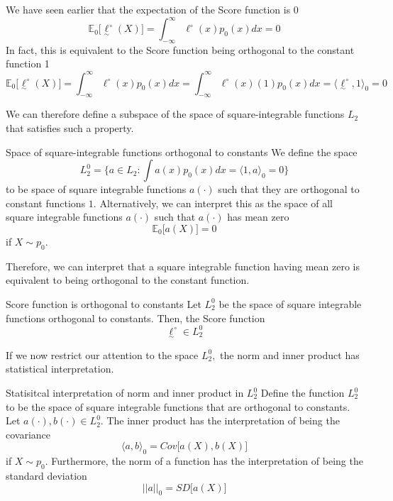 \documentclass[twoside]{article}
\newcommand{\utilde}{\underset{\sim}}
\begin{document}
We have seen earlier that the expectation of the Score function is 0
$$
  \mathbb{E}_{0}\bigg[\utilde{\ell}^{\circ}(X) \bigg] = \int_{-\infty}^{\infty}\ell^{\circ}(x)p_0(x)dx = 0
$$
In fact, this is equivalent to the Score function being orthogonal to the constant function 1
$$
  \mathbb{E}_{0}\bigg[\utilde{\ell}^{\circ}(X) \bigg] = \int_{-\infty}^{\infty}\ell^{\circ}(x)p_0(x)dx = \int_{-\infty}^{\infty}\ell^{\circ}(x)(1)p_0(x)dx = \langle \utilde{\ell}^{\circ}, 1 \rangle_0 = 0
$$

We can therefore define a subspace of the space of square-integrable functions $L_2$ that satisfies such a property.

\begin{definition_exam}{Space of square-integrable functions orthogonal to constants}{} We define the space  
\begin{equation}
  L_{2}^{0} = \{a \in L_2: \int a(x)p_0(x)dx = \langle 1, a \rangle_{0} = 0\} 
\end{equation}
to be space of square integrable functions $a(\cdot)$ such that they are orthogonal to constant functions $1.$ Alternatively, we can interpret this as the space of all square integrable functions $a(\cdot)$ such that $a(\cdot)$ has mean zero 
\begin{equation}
  \mathbb{E}_{0}\big[a(X) \big] = 0
\end{equation}
if $X \sim p_0.$
\end{definition_exam}

Therefore, we can interpret that a square integrable function having mean zero is equivalent to being orthogonal to the constant function.

\begin{proposition_exam}{Score function is orthogonal to constants}{} Let $L_{2}^{0}$ be the space of square integrable functions orthogonal to constants. Then, the Score function 
\begin{equation}
  \utilde{\ell}^{\circ} \in L_{2}^{0}
\end{equation}
\end{proposition_exam}

If we now restrict our attention to the space $L_{2}^{0},$ the norm and inner product has statistical interpretation. 

\begin{proposition_exam}{Statisitcal interpretation of norm and inner product in $L_{2}^{0}$}{} Define the function $L_{2}^{0}$ to be the space of square integrable functions that are orthogonal to constants. Let $a(\cdot), b(\cdot) \in L_2^{0}.$ The inner product has the interpretation of being the covariance 
\begin{equation}
  \langle a, b \rangle_{0} = Cov\big[a(X), b(X) \big]
\end{equation}
if $X \sim p_0.$ Furthermore, the norm of a function has the interpretation of being the standard deviation 
\begin{equation}
  ||a||_{0} = SD\big[a(X) \big]
\end{equation}
\end{proposition_exam}
\end{document}
